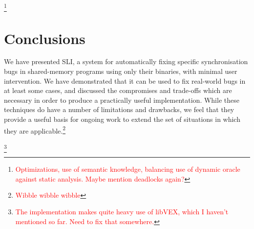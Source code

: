 \documentclass[10pt,twocolumn,preprint,natbib,authoryear]{sigplanconf}
\newcommand{\editorial}[1]{\textcolor{red}{\footnote{\textcolor{red}{#1}}}}
\begin{document}
\editorial{Optimizations, use of semantic knowledge, balancing use of
  dynamic oracle against static analysis.  Maybe mention deadlocks
  again?}

\section{Conclusions}

We have presented SLI, a system for automatically fixing specific
synchronisation bugs in shared-memory programs using only their
binaries, with minimal user intervention.  We have demonstrated that
it can be used to fix real-world bugs in at least some cases, and
discussed the compromises and trade-offs which are necessary in order
to produce a practically useful implementation.  While these
techniques do have a number of limitations and drawbacks, we feel that
they provide a useful basis for ongoing work to extend the set of
situations in which they are applicable.\editorial{Wibble wibble
  wibble}

\acks

\editorial{The implementation makes quite heavy use of libVEX, which I
  haven't mentioned so far.  Need to fix that somewhere.}




\end{document}
